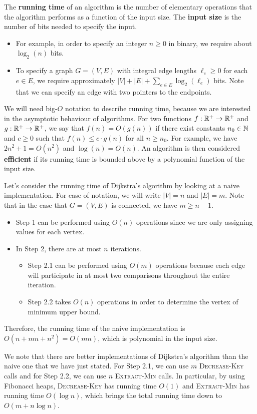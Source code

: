 The {\bf running time} of an algorithm is the number of elementary operations 
that the algorithm performs as a function of the input size. The {\bf input 
size} is the number of bits needed to specify the input. 
\begin{itemize}
    \item For example, in order to specify an integer $n \geq 0$ in binary, 
    we require about $\log_2(n)$ bits. 
    \item To specify a graph $G = (V, E)$ with integral edge lengths 
    $\ell_e \geq 0$ for each $e \in E$, we require approximately 
    $|V| + |E| + \sum_{e\in E} \log_2(\ell_e)$ bits. Note that we can 
    specify an edge with two pointers to the endpoints.
\end{itemize} 
We will need big-$O$ notation to describe running time, because we are 
interested in the asymptotic behaviour of algorithms. For two functions
$f : \mathbb{R}^+ \to \mathbb{R}^+$ and $g : \mathbb{R}^+ \to \mathbb{R}^+$, we say that $f(n) = 
O(g(n))$ if there exist constants $n_0 \in \mathbb{N}$ and $c \geq 0$ such that 
$f(n) \leq c \cdot g(n)$ for all $n \geq n_0$. For example, we have 
$2n^2 + 1 = O(n^2)$ and $\log(n) = O(n)$. An algorithm is then considered 
{\bf efficient} if its running time is bounded above by a polynomial function 
of the input size. 

Let's consider the running time of Dijkstra's algorithm by looking 
at a naive implementation. For ease of notation, we will write 
$|V| = n$ and $|E| = m$. Note that in the case that $G = (V, E)$ is connected, 
we have $m \geq n-1$. 
\begin{itemize}
    \item Step 1 can be performed using $O(n)$ operations since we are only
    assigning values for each vertex. 
    \item In Step 2, there are at most $n$ iterations. 
    \begin{itemize}
        \item Step 2.1 can be performed using $O(m)$ operations because 
        each edge will participate in at most two comparisons throughout the 
        entire iteration. 
        \item Step 2.2 takes $O(n)$ operations in order to determine the 
        vertex of minimum upper bound. 
    \end{itemize}
\end{itemize}
Therefore, the running time of the naive implementation is 
$O(n + mn + n^2) = O(mn)$, which is polynomial in the input size.  

We note that there are better implementations of Dijkstra's algorithm 
than the naive one that we have just stated. For Step 2.1, we can 
use $m$ \textsc{Decrease-Key} calls and for Step 2.2, we can use 
$n$ \textsc{Extract-Min} calls. In particular, by using Fibonacci heaps, 
\textsc{Decrease-Key} has running time $O(1)$ and \textsc{Extract-Min} 
has running time $O(\log n)$, which brings the total running time down to 
$O(m + n\log n)$.